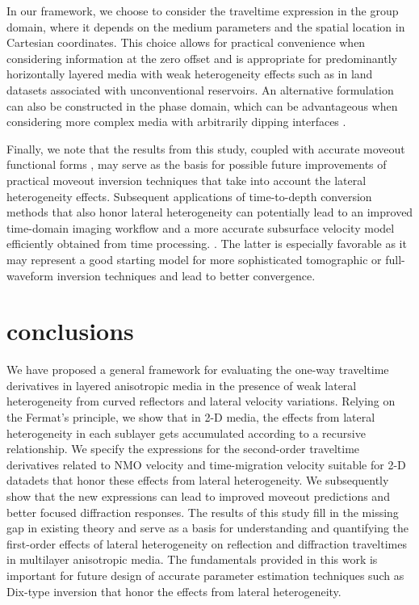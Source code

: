 In our framework, we choose to consider the traveltime expression in the group domain, where it depends on the medium parameters and the spatial location in Cartesian coordinates. This choice allows for practical convenience when considering information at the zero offset and is appropriate for predominantly horizontally layered media with weak heterogeneity effects such as in land datasets associated with unconventional reservoirs. An alternative formulation can also be constructed in the phase domain, which can be advantageous when considering more complex media with arbitrarily dipping interfaces \cite[]{nmosurface,stackingtomo}.

Finally, we note that the results from this study, coupled with accurate moveout functional forms \cite[]{fomelstovas,zonegmapaper}, may serve as the basis for possible future improvements of practical moveout inversion techniques that take into account the lateral heterogeneity effects. Subsequent applications of time-to-depth conversion methods that also honor lateral heterogeneity can potentially lead to an improved time-domain imaging workflow and a more accurate subsurface velocity model efficiently obtained from time processing. \cite[]{cam2007,siweit2d,valente,zonet2dweak}. The latter is especially favorable as it may represent a good starting model for more sophisticated tomographic or full-waveform inversion techniques and lead to better convergence.

\section{conclusions}

We have proposed a general framework for evaluating the one-way traveltime derivatives in layered anisotropic media in the presence of weak lateral heterogeneity from curved reflectors and lateral velocity variations. Relying on the Fermat’s principle, we show that in 2-D media, the effects from lateral heterogeneity in each sublayer gets accumulated according to a recursive relationship. We specify the expressions for the second-order traveltime derivatives related to NMO velocity and time-migration velocity suitable for 2-D datadets that honor these effects from lateral heterogeneity. We subsequently show that the new expressions can lead to improved moveout predictions and better focused diffraction responses. The results of this study fill in the missing gap in existing theory and serve as a basis for understanding and quantifying the first-order effects of lateral heterogeneity on reflection and diffraction traveltimes in multilayer anisotropic media. The fundamentals provided in this work is important for future design of accurate parameter estimation techniques such as Dix-type inversion that honor the effects from lateral heterogeneity.

